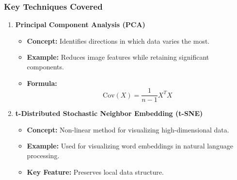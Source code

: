 \documentclass[aspectratio=169]{beamer}
\begin{document}
\begin{frame}[fragile]
    \frametitle{Key Techniques Covered}
    \begin{enumerate}
        \item \textbf{Principal Component Analysis (PCA)}
            \begin{itemize}
                \item \textbf{Concept:} Identifies directions in which data varies the most.
                \item \textbf{Example:} Reduces image features while retaining significant components.
                \item \textbf{Formula:} \[
                \text{Cov}(X) = \frac{1}{n-1} X^T X
                \]
            \end{itemize}
            
        \item \textbf{t-Distributed Stochastic Neighbor Embedding (t-SNE)}
            \begin{itemize}
                \item \textbf{Concept:} Non-linear method for visualizing high-dimensional data.
                \item \textbf{Example:} Used for visualizing word embeddings in natural language processing.
                \item \textbf{Key Feature:} Preserves local data structure.
            \end{itemize}
    \end{enumerate}
\end{frame}
\end{document}

